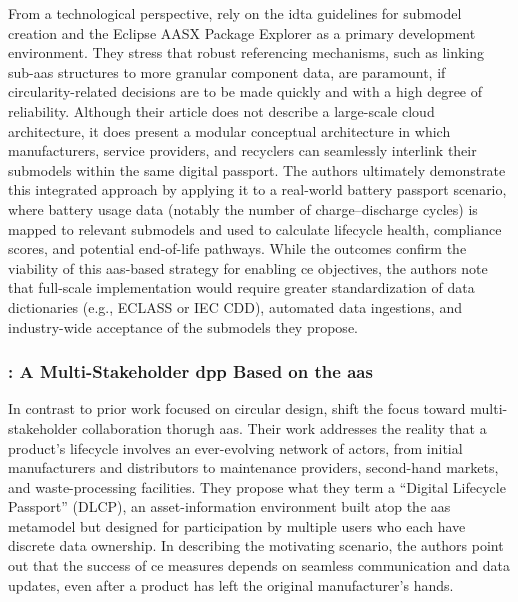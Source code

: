 From a technological perspective,\textcite{Kuhn.2025} rely on the \ac{idta} guidelines for submodel creation and the Eclipse AASX Package Explorer as a primary development environment. They stress that robust referencing mechanisms, such as linking sub-\ac{aas} structures to more granular component data, are paramount, if circularity-related decisions are to be made quickly and with a high degree of reliability. Although their article does not describe a large-scale cloud architecture, it does present a modular conceptual architecture in which manufacturers, service providers, and recyclers can seamlessly interlink their submodels within the same digital passport. The authors ultimately demonstrate this integrated approach by applying it to a real-world battery passport scenario, where battery usage data (notably the number of charge–discharge cycles) is mapped to relevant submodels and used to calculate lifecycle health, compliance scores, and potential end-of-life pathways. While the outcomes confirm the viability of this \ac{aas}-based strategy for enabling \ac{ce} objectives, the authors note that full-scale implementation would require greater standardization of data dictionaries (e.g., ECLASS or IEC CDD), automated data ingestions, and industry-wide acceptance of the submodels they propose. \autocite{Kuhn.2025}

\subsubsection*{\textcite{Pourjafarian.2023}: A Multi-Stakeholder \ac{dpp} Based on the \ac{aas}}
In contrast to prior work focused on circular design, \textcite{Pourjafarian.2023} shift the focus toward multi-stakeholder collaboration thorugh \ac{aas}. Their work addresses the reality that a product’s lifecycle involves an ever-evolving network of actors, from initial manufacturers and distributors to maintenance providers, second-hand markets, and waste-processing facilities. They propose what they term a “Digital Lifecycle Passport” (DLCP), an asset-information environment built atop the \ac{aas} metamodel but designed for participation by multiple users who each have discrete data ownership. In describing the motivating scenario, the authors point out that the success of \ac{ce} measures depends on seamless communication and data updates, even after a product has left the original manufacturer’s hands. \autocite{Pourjafarian.2023}


